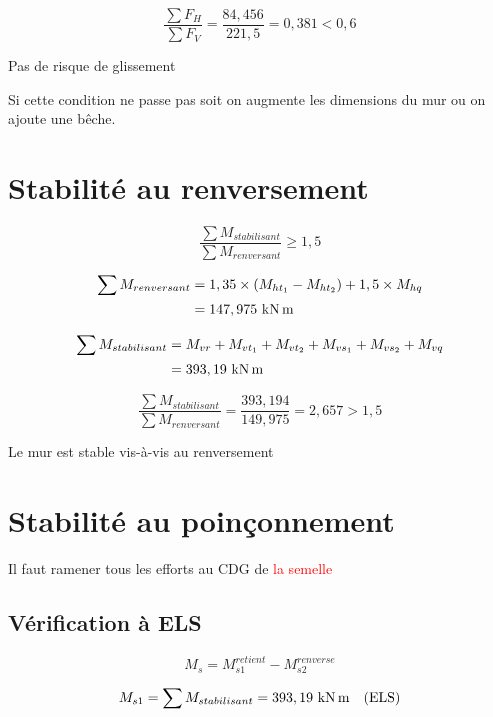 \documentclass[12pt,a4paper]{report}
\newcommand{\fH}{F_{H}}
\newcommand{\mht}{M_{ht_{1}}}
\newcommand{\mhtt}{M_{ht_{2}}}
\newcommand{\mhq}{M_{hq}}
\newcommand{\fV}{F_{V}}
\newcommand{\mvr}{M_{vr}}
\newcommand{\mvs}{M_{vs_{1}}}
\newcommand{\mvss}{M_{vs_{2}}}
\newcommand{\mvt}{M_{vt_{1}}}
\newcommand{\mvtt}{M_{vt_{2}}}
\newcommand{\mvq}{M_{vq}}
\begin{document}
	
	\[ \dfrac{\sum \fH}{\sum \fV} = \dfrac{84,456}{221,5} = 0,381 < 0,6 \]
	
	{\centering Pas de risque de glissement\par}
	
	\begin{tcolorbox}[colback=gray!20, colframe=black, title=Remarque]
		Si cette condition ne passe pas soit on augmente les dimensions du mur ou on ajoute une bêche.
	\end{tcolorbox}
	
	
	
	\section{Stabilité au renversement}
	
	\[ \dfrac{\sum M_{stabilisant}}{\sum M_{renversant}} \geq 1,5 \]
	
	\[ \begin{aligned}
		\sum M_{renversant} &= 1,35 \times (\mht - \mhtt) + 1,5 \times \mhq \\
		&= 147,975\knxm
	\end{aligned} \]
	
	\[ \begin{aligned}
		\sum M_{stabilisant} &= \mvr + \mvt + \mvtt + \mvs + \mvss + \mvq \\
		&= 393,19\knxm 
	\end{aligned} \]
	
	\[ \dfrac{\sum M_{stabilisant}}{\sum M_{renversant}} = \dfrac{393,194}{149,975} = 2,657 > 1,5 \]
	
	{\centering Le mur est stable vis-à-vis au renversement\par}
	
	\section{Stabilité au poinçonnement}
	
	Il faut ramener tous les efforts au CDG de \textcolor{red}{la semelle}
	
	\subsection{Vérification à ELS}
	
	\[ M_{s} = M_{s1}^{retient} - M_{s2}^{renverse} \]
	
	
	\[ M_{s1} = \sum M_{stabilisant} = 393,19\knxm \quad \text{(ELS)} \]
	
\end{document}

